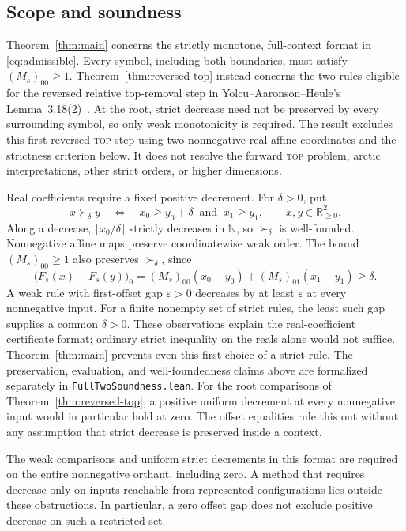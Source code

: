 \documentclass[11pt,a4paper]{article}
\newcommand{\R}{\mathbb R}
\newcommand{\nn}{\R_{\ge0}}
\newcommand{\code}[1]{\texttt{#1}}
\begin{document}
\subsection{Scope and soundness}
Theorem~\ref{thm:main} concerns the strictly monotone, full-context
format in \eqref{eq:admissible}. Every symbol, including both
boundaries, must satisfy $(M_s)_{00}\ge1$.
Theorem~\ref{thm:reversed-top} instead concerns the two rules eligible
for the reversed relative top-removal step in
Yolcu--Aaronson--Heule's Lemma~3.18(2)~\cite{yah}. At the root,
strict decrease need not be preserved by every surrounding symbol,
so only weak monotonicity is required.
The result excludes this first reversed \textsc{top} step using two
nonnegative real affine coordinates and the strictness criterion below.
It does not resolve the forward \textsc{top} problem, arctic
interpretations, other strict orders, or higher dimensions.

Real coefficients require a fixed positive decrement. For $\delta>0$,
put
\[
x\succ_\delta y\quad\Longleftrightarrow\quad
x_0\ge y_0+\delta\ \text{ and }\ x_1\ge y_1,
\qquad x,y\in\nn^2.
\]
Along a decrease, $\lfloor x_0/\delta\rfloor$ strictly decreases in
$\mathbb N$, so $\succ_\delta$ is well-founded. Nonnegative affine maps
preserve coordinatewise weak order. The bound $(M_s)_{00}\ge1$ also
preserves $\succ_\delta$, since
\[
\bigl(F_s(x)-F_s(y)\bigr)_0
 = (M_s)_{00}(x_0-y_0)+(M_s)_{01}(x_1-y_1)\ge\delta.
\]
A weak rule with first-offset gap $\varepsilon>0$ decreases by at least
$\varepsilon$ at every nonnegative input. For a finite nonempty set of
strict rules, the least such gap supplies a common $\delta>0$.
These observations explain the real-coefficient certificate format;
ordinary strict inequality on the reals alone would not suffice.
Theorem~\ref{thm:main} prevents even this first choice of a strict rule.
The preservation, evaluation, and well-foundedness claims above are
formalized separately in \code{FullTwoSoundness.lean}.
For the root comparisons of Theorem~\ref{thm:reversed-top}, a positive
uniform decrement at every nonnegative input would in particular hold
at zero. The offset equalities rule this out without any assumption
that strict decrease is preserved inside a context.

The weak comparisons and uniform strict decrements in this format are
required on the entire nonnegative orthant, including zero. A method
that requires decrease only on inputs reachable from represented
configurations lies outside these obstructions. In particular, a zero
offset gap does not exclude positive decrease on such a restricted set.
\end{document}
